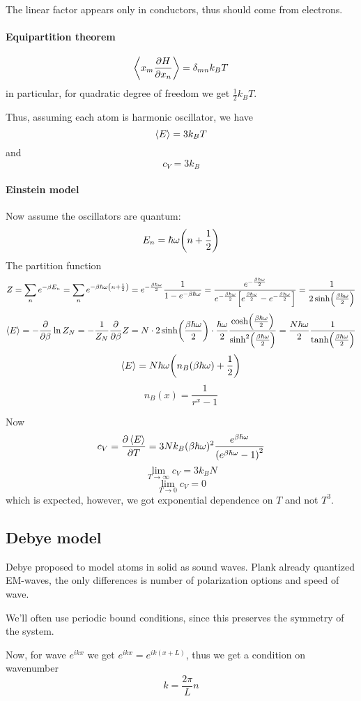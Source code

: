 The linear factor appears only in conductors, thus should come from electrons.
\paragraph{Equipartition theorem}
$$
\expval{x_{m} \frac{\partial H}{\partial x_{n}}}  = \delta_{mn} k_{B} T
$$
in particular, for quadratic degree of freedom we get $\frac{1}{2}k_BT$.

Thus, assuming each atom is harmonic oscillator, we have
$$\expval{E} = 3k_BT$$
and
$$c_V = 3k_B$$
\paragraph{Einstein model}
Now assume the oscillators are quantum:
$$E_n=\hbar \omega\qty(n+\frac{1}{2})$$
The partition function
$$Z = \sum_n e^{-\beta E_n} = \sum_n e^{-\beta \hbar \omega \qty(n+\frac{1}{2})} = e^{-\frac{\beta \hbar \omega}{2}}\frac{1}{1-e^{-\beta \hbar \omega}} = \frac{e^{-\frac{\beta \hbar \omega}{2}}}{e^{-\frac{\beta \hbar \omega}{2}} \qty[e^{\frac{\beta \hbar \omega}{2}}-e^{-\frac{\beta \hbar \omega}{2}}]} = \frac{1}{2\sinh(\frac{\beta \hbar \omega}{2})}$$
$$\expval{E}  = -\pdv{\beta} \ln Z_N = -\frac{1}{Z_N} \pdv{\beta} Z = N \cdot 2\sinh(\frac{\beta \hbar \omega}{2}) \cdot \frac{\hbar \omega}{2}\frac{\cosh(\frac{\beta \hbar \omega}{2})}{\sinh[2](\frac{\beta \hbar \omega}{2})} = \frac{N\hbar \omega}{2} \frac{1}{\tanh(\frac{\beta \hbar \omega}{2})}$$
$$\expval{E}  = N\hbar\omega \qty(n_B(\beta \hbar \omega)+\frac{1}{2})$$
$$n_B(x) = \frac{1}{r^x-1}$$

Now
$$c_V = \pdv{\expval{E}}{T} = 3N k_B (\beta \hbar  \omega)^2 \frac{e^{\beta \hbar \omega}}{\qty(e^{\beta \hbar \omega}-1)^2}$$
$$\lim_{T\to \infty } c_V = 3k_BN$$
$$\lim_{T\to 0 } c_V = 0$$
which is expected, however, we got exponential dependence on $T$ and not $T^3$.
\subsection{Debye model}
Debye proposed to model atoms in solid as sound waves. Plank already quantized EM-waves, the only differences is number of polarization options and speed of wave.


We'll often use periodic bound conditions, since this preserves the symmetry of the system.

Now, for wave $e^{ikx}$ we get $e^{ikx}=e^{ik(x+L)}$, thus we get a condition on wavenumber
$$k=\frac{2\pi}{L}n$$

